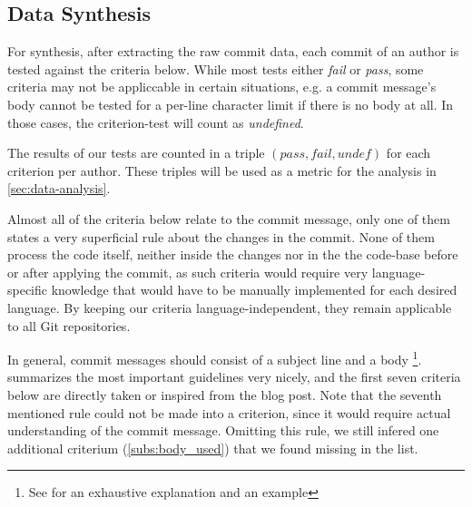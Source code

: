 \subsection{Data Synthesis}
\label{sec:data-synthesis}

%
%
%
%
%
%

For synthesis, after extracting the raw commit data, each commit of an author is tested against the criteria below. While most tests either \emph{fail} or \emph{pass}, some criteria may not be appliccable in certain situations, e.g. a commit message's body cannot be tested for a per-line character limit if there is no body at all. In those cases, the criterion-test will count as \emph{undefined}.

The results of our tests are counted in a triple $(pass, fail, undef)$ for each criterion per author. These triples will be used as a metric for the analysis in \ref{sec:data-analysis}.

Almost all of the criteria below relate to the commit message, only one of them states a very superficial rule about the changes in the commit. None of them process the code itself, neither inside the changes nor in the the code-base before or after applying the commit, as such criteria would require very language-specific knowledge that would have to be manually implemented for each desired language. By keeping our criteria language-independent, they remain applicable to all Git repositories.

In general, commit messages should consist of a subject line and a body \footnote{See \cite{OffGuide} for an exhaustive explanation and an example}. \cite{CB} summarizes the most important guidelines very nicely, and the first seven criteria below are directly taken or inspired from the blog post. Note that the seventh mentioned rule could not be made into a criterion, since it would require actual understanding of the commit message. Omitting this rule, we still infered one additional criterium (\ref{subs:body_used}) that we found missing in the list.

